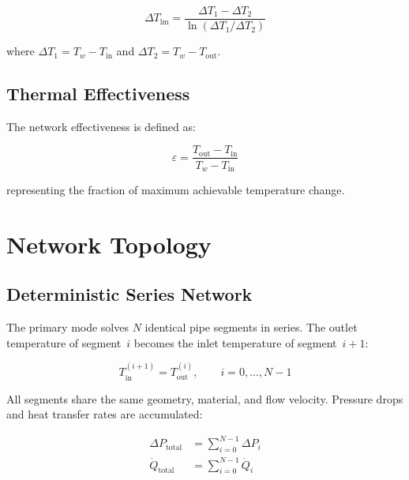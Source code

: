 \documentclass[11pt]{article}
\begin{document}
\begin{equation}
  \Delta T_{\text{lm}} = \frac{\Delta T_1 - \Delta T_2}
                              {\ln(\Delta T_1 / \Delta T_2)}
  \label{eq:lmtd}
\end{equation}

where $\Delta T_1 = T_w - T_{\text{in}}$ and
$\Delta T_2 = T_w - T_{\text{out}}$.

\subsection{Thermal Effectiveness}

The network effectiveness is defined as:

\begin{equation}
  \varepsilon = \frac{T_{\text{out}} - T_{\text{in}}}
                     {T_w - T_{\text{in}}}
  \label{eq:effectiveness}
\end{equation}

representing the fraction of maximum achievable temperature change.

\section{Network Topology}

\subsection{Deterministic Series Network}

The primary mode solves $N$ identical pipe segments in series.  The outlet
temperature of segment~$i$ becomes the inlet temperature of segment~$i+1$:

\begin{equation}
  T_{\text{in}}^{(i+1)} = T_{\text{out}}^{(i)}, \qquad i = 0, \ldots, N-1
\end{equation}

All segments share the same geometry, material, and flow velocity.
Pressure drops and heat transfer rates are accumulated:

\begin{align}
  \Delta P_{\text{total}} &= \sum_{i=0}^{N-1} \Delta P_i \\
  \dot{Q}_{\text{total}}  &= \sum_{i=0}^{N-1} \dot{Q}_i
\end{align}
\end{document}
